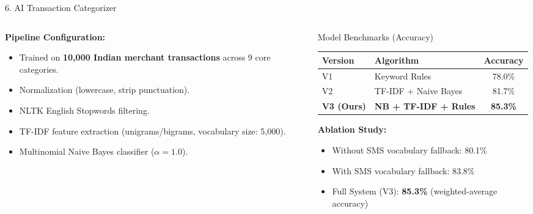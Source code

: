 \documentclass[10pt,aspectratio=169]{beamer}
\begin{document}
\begin{frame}{6. AI Transaction Categorizer}
    \begin{columns}[T]
        \begin{column}{0.5\textwidth}
            \textbf{Pipeline Configuration:}
            \begin{itemize}
                \item Trained on \textbf{10,000 Indian merchant transactions} across 9 core categories.
                \item Normalization (lowercase, strip punctuation).
                \item NLTK English Stopwords filtering.
                \item TF-IDF feature extraction (unigrams/bigrams, vocabulary size: 5,000).
                \item Multinomial Naive Bayes classifier ($\alpha = 1.0$).
            \end{itemize}
        \end{column}
        \begin{column}{0.5\textwidth}
            \begin{block}{Model Benchmarks (Accuracy)}
                \centering
                \begin{tabular}{llc}
                    \toprule
                    Version & Algorithm & Accuracy \\
                    \midrule
                    V1 & Keyword Rules & 78.0\% \\
                    V2 & TF-IDF + Naive Bayes & 81.7\% \\
                    \textbf{V3 (Ours)} & \textbf{NB + TF-IDF + Rules} & \textbf{85.3\%} \\
                    \bottomrule
                \end{tabular}
            \end{block}
            \textbf{Ablation Study:}
            \begin{itemize}
                \item Without SMS vocabulary fallback: 80.1\%
                \item With SMS vocabulary fallback: 83.8\%
                \item Full System (V3): \textbf{85.3\%} (weighted-average accuracy)
            \end{itemize}
        \end{column}
    \end{columns}
\end{frame}
\end{document}
